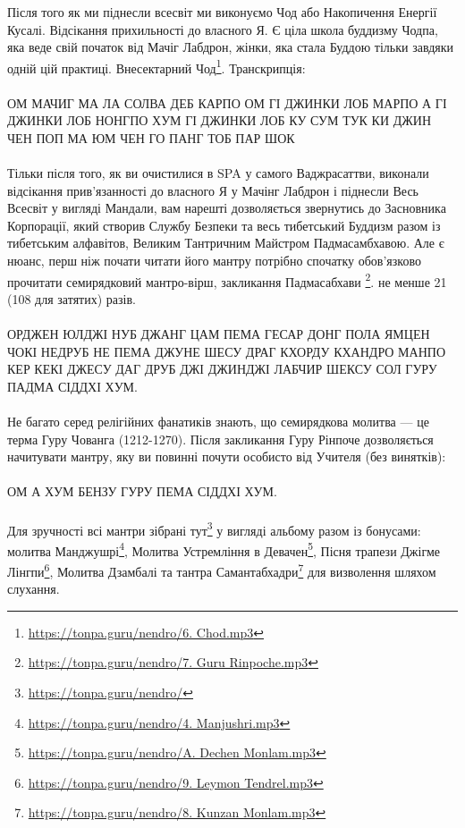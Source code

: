 Після того як ми піднесли всесвіт ми виконуємо
Чод або Накопичення Енергії Кусалі. Відсікання
прихильності до власного Я. Є ціла школа
буддизму Чодпа, яка веде свій початок від Мачіг Лабдрон,
жінки, яка стала Буддою тільки завдяки одній
цій практиці. Внесектарний Чод\footnote{\url{https://tonpa.guru/nendro/6. Chod.mp3}}.
Транскрипція:
\\
\\
ОМ МАЧИГ МА ЛА СОЛВА ДЕБ КАРПО ОМ ГІ ДЖИНКИ ЛОБ
МАРПО А ГІ ДЖИНКИ ЛОБ НОНГПО ХУМ ГІ ДЖИНКИ ЛОБ
КУ СУМ ТУК КИ ДЖИН ЧЕН ПОП МА ЮМ ЧЕН ГО ПАНГ ТОБ ПАР ШОК
\\
\\
Тільки після того, як ви очистилися в SPA у самого Ваджрасаттви,
виконали відсікання прив'язанності до власного Я у Мачінг Лабдрон
і піднесли Весь Всесвіт у вигляді Мандали, вам нарешті дозволяється
звернутись до Засновника Корпорації, який створив Службу
Безпеки та весь тибетський Буддизм разом із тибетським
алфавітов, Великим Тантричним Майстром Падмасамбхавою.
Але є нюанс, перш ніж почати читати його мантру
потрібно спочатку обов'язково прочитати семирядковий мантро-вірш,
закликання Падмасабхави
\footnote{\url{https://tonpa.guru/nendro/7. Guru Rinpoche.mp3}}.
не менше 21 (108 для затятих) разів.
\\
\\
ОРДЖЕН ЮЛДЖІ НУБ ДЖАНГ ЦАМ ПЕМА ГЕСАР ДОНГ ПОЛА
ЯМЦЕН ЧОКІ НЕДРУБ НЕ ПЕМА ДЖУНЕ ШЕСУ ДРАГ КХОРДУ
КХАНДРО МАНПО КЕР КЕКІ ДЖЕСУ ДАГ ДРУБ ДЖІ ДЖИНДЖІ
ЛАБЧИР ШЕКСУ СОЛ ГУРУ ПАДМА СІДДХІ ХУМ.
\\
\\
Не багато серед релігійних фанатиків знають, що семирядкова
молитва --- це терма Гуру Чованга (1212-1270). Після закликання
Гуру Рінпоче дозволяється начитувати мантру, яку ви повинні
почути особисто від Учителя (без винятків):
\\
\\
ОМ А ХУМ БЕНЗУ ГУРУ ПЕМА СІДДХІ ХУМ.
\\
\\
Для зручності всі мантри зібрані тут\footnote{\url{https://tonpa.guru/nendro/}} у вигляді альбому
разом із бонусами: молитва Манджушрі\footnote{\url{https://tonpa.guru/nendro/4. Manjushri.mp3}},
Молитва Устремління в Девачен\footnote{\url{https://tonpa.guru/nendro/A. Dechen Monlam.mp3}},
Пісня трапези Джігме Лінгпи\footnote{\url{https://tonpa.guru/nendro/9. Leymon Tendrel.mp3}},
Молитва Дзамбалі та тантра Самантабхадри\footnote{\url{https://tonpa.guru/nendro/8. Kunzan Monlam.mp3}} для
визволення шляхом слухання.
